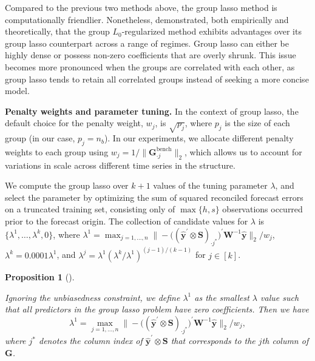\documentclass[
  11pt]{article}
\theoremstyle{plain}
\newtheorem{proposition}{Proposition}[section]
\theoremstyle{remark}
\begin{document}
Compared to the previous two methods above, the group lasso method is
computationally friendlier. Nonetheless, \citet{Hazimeh2023-ie}
demonstrated, both empirically and theoretically, that the group
\(L_0\)-regularized method exhibits advantages over its group lasso
counterpart across a range of regimes. Group lasso can either be highly
dense or possess non-zero coefficients that are overly shrunk. This
issue becomes more pronounced when the groups are correlated with each
other, as group lasso tends to retain all correlated groups instead of
seeking a more concise model.

\textbf{Penalty weights and parameter tuning.} In the context of group
lasso, the default choice for the penalty weight, \(w_j\), is
\(\sqrt{p_j}\), where \(p_j\) is the size of each group (in our case,
\(p_j = n_b\)). In our experiments, we allocate different penalty
weights to each group using
\(w_j = 1/\|\bm{G}_{\cdot j}^{\text{bench}}\|_2\), which allows us to
account for variations in scale across different time series in the
structure.

We compute the group lasso over \(k+1\) values of the tuning parameter
\(\lambda\), and select the parameter by optimizing the sum of squared
reconciled forecast errors on a truncated training set, consisting only
of \(\max\{h, s\}\) observations occurred prior to the forecast origin.
The collection of candidate values for \(\lambda\) is
\(\{\lambda^{1},\dots,\lambda^{k}, 0\}\), where
\(\lambda^{1} = \max_{j=1, \ldots, n}\big\|-\big((\hat{\bm{y}}^{\prime} \otimes \bm{S})_{\cdot j^{*}}\big)^{\prime} \bm{W}^{-1} \hat{\bm{y}}\big\|_2 / w_j\),
\(\lambda^{k} = 0.0001\lambda^{1}\), and
\(\lambda^{j} = \lambda^{1}(\lambda^{k} / \lambda^{1})^{(j-1) / (k-1)}\)
for \(j \in [k]\).

\begin{proposition}[]\protect\hypertarget{prp-3}{}\label{prp-3}

Ignoring the unbiasedness constraint, we define \(\lambda^{1}\) as the
smallest \(\lambda\) value such that all predictors in the group lasso
problem have zero coefficients. Then we have \[
\lambda^{1} = \max_{j=1, \ldots, n}\big\|-\big((\hat{\bm{y}}^{\prime} \otimes \bm{S})_{\cdot j^{*}}\big)^{\prime} \bm{W}^{-1} \hat{\bm{y}}\big\|_2 / w_j,
\] where \(j^{*}\) denotes the column index of
\(\hat{\bm{y}}^{\prime} \otimes \bm{S}\) that corresponds to the \(j\)th
column of \(\bm{G}\).

\end{proposition}
\end{document}
